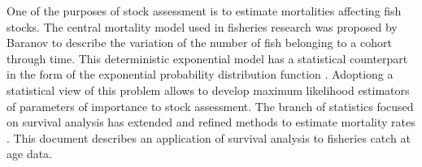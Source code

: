 One of the purposes of stock assessment is to estimate mortalities affecting fish stocks. The central mortality model used in fisheries research was proposed by Baranov \citep{quin99b} to describe the variation of the number of fish belonging to a cohort through time. This deterministic exponential model has a statistical counterpart in the form of the exponential probability distribution function \citep{cow98b}. Adoptiong a statistical view of this problem allows to develop maximum likelihood estimators \citep{Burnb03} of parameters of importance to stock assessment. The branch of statistics focused on survival analysis has extended and refined methods to estimate mortality rates \citep{cox84b}. This document describes an application of survival analysis to fisheries catch at age data.
